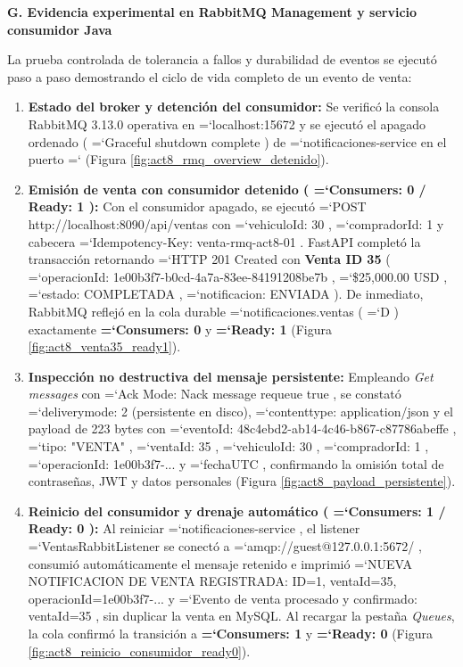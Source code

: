 \documentclass[11pt,a4paper]{article}
\renewcommand{\_}{\oldunderscore\allowbreak}
\DeclareRobustCommand{\texttt}[1]{%
  {\upshape\ttfamily\fontsize{9}{10.8}\selectfont\hyphenchar\font=`\-\relax #1}%
}
\begin{document}
\vspace{0.2cm}
\noindent\textbf{G. Evidencia experimental en RabbitMQ Management y servicio consumidor Java}

\noindent La prueba controlada de tolerancia a fallos y durabilidad de eventos se ejecutó paso a paso demostrando el ciclo de vida completo de un evento de venta:
\begin{enumerate}[leftmargin=*,itemsep=3pt,topsep=2pt]
  \item \textbf{Estado del broker y detención del consumidor:} Se verificó la consola RabbitMQ 3.13.0 operativa en \texttt{localhost:\allowbreak{}15672} y se ejecutó el apagado ordenado (\texttt{Graceful shutdown complete}) de \texttt{notificaciones-service} en el puerto \texttt{8081} (Figura \ref{fig:act8_rmq_overview_detenido}).
  \item \textbf{Emisión de venta con consumidor detenido (\texttt{Consumers: 0 / Ready: 1}):} Con el consumidor apagado, se ejecutó \texttt{POST http:\allowbreak{}/\allowbreak{}/\allowbreak{}localhost:\allowbreak{}8090/\allowbreak{}api/\allowbreak{}ventas} con \texttt{vehiculoId: 30}, \texttt{compradorId: 1} y cabecera \texttt{Idempotency-Key: venta-rmq-act8-01}. FastAPI completó la transacción retornando \texttt{HTTP 201 Created} con \textbf{Venta ID 35} (\texttt{operacionId: 1e00b3f7-b0cd-4a7a-83ee-84191208be7b}, \texttt{\$25,\allowbreak{}000.\allowbreak{}00 USD}, \texttt{estado: COMPLETADA}, \texttt{notificacion: ENVIADA}). De inmediato, RabbitMQ reflejó en la cola durable \texttt{notificaciones.\allowbreak{}ventas} (\texttt{D}) exactamente \textbf{\texttt{Consumers: 0}} y \textbf{\texttt{Ready: 1}} (Figura \ref{fig:act8_venta35_ready1}).
  \item \textbf{Inspección no destructiva del mensaje persistente:} Empleando \textit{Get messages} con \texttt{Ack Mode: Nack message requeue true}, se constató \texttt{delivery\_mode: 2} (persistente en disco), \texttt{content\_type: application/\allowbreak{}json} y el payload de 223 bytes con \texttt{eventoId: 48c4ebd2-ab14-4c46-b867-c87786abeffe}, \texttt{tipo: "VENTA"}, \texttt{ventaId: 35}, \texttt{vehiculoId: 30}, \texttt{compradorId: 1}, \texttt{operacionId: 1e00b3f7-...} y \texttt{fechaUTC}, confirmando la omisión total de contraseñas, JWT y datos personales (Figura \ref{fig:act8_payload_persistente}).
  \item \textbf{Reinicio del consumidor y drenaje automático (\texttt{Consumers: 1 / Ready: 0}):} Al reiniciar \texttt{notificaciones-service}, el listener \texttt{VentasRabbitListener} se conectó a \texttt{amqp:\allowbreak{}/\allowbreak{}/\allowbreak{}guest@127.\allowbreak{}0.\allowbreak{}0.\allowbreak{}1:\allowbreak{}5672/}, consumió automáticamente el mensaje retenido e imprimió \texttt{NUEVA NOTIFICACION DE VENTA REGISTRADA: ID=\allowbreak{}1, ventaId=\allowbreak{}35, operacionId=\allowbreak{}1e00b3f7-...} y \texttt{Evento de venta procesado y confirmado: ventaId=\allowbreak{}35}, sin duplicar la venta en MySQL. Al recargar la pestaña \textit{Queues}, la cola confirmó la transición a \textbf{\texttt{Consumers: 1}} y \textbf{\texttt{Ready: 0}} (Figura \ref{fig:act8_reinicio_consumidor_ready0}).
\end{enumerate}
\end{document}

